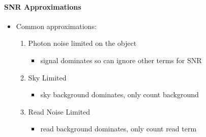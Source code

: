 \documentclass[a4paper,11pt,normalem]{article}
\begin{document}
\paragraph{SNR Approximations}
\begin{itemize}
    \item Common approximations:
        \begin{enumerate}
            \item Photon noise limited on the object
                \begin{itemize}
                    \item signal dominates so can ignore other terms for SNR
                \end{itemize}
            \item Sky Limited
                \begin{itemize}
                    \item sky background dominates, only count background
                \end{itemize}
            \item Read Noise Limited
                \begin{itemize}
                    \item read background dominates, only count read term
                \end{itemize}
        \end{enumerate}
\end{itemize}

\section{}
\end{document}
